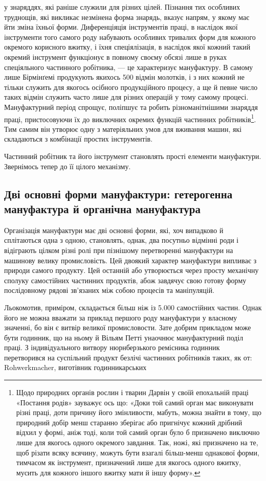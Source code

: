 \parcont{}  %
у знаряддях, які раніше служили для різних цілей. Пізнання
тих особливих труднощів, які викликає незмінена форма знарядь,
вказує напрям, у якому має йти зміна їхньої форми. Диференціяція
інструментів праці, в наслідок якої інструменти того самого роду
набувають особливих тривалих форм для кожного окремого
корисного вжитку, і їхня спеціялізація, в наслідок якої кожний
такий окремий інструмент функціонує в повному своєму обсязі
лише в руках спеціяльного частинного робітника, — це характеризує мануфактуру.
В самому лише Бірмінґемі продукують
якихось 500 відмін молотків, і з них кожний не тільки служить
для якогось осібного продукційного процесу, а ще й певне число
таких відмін служить часто лише для різних операцій у тому
самому процесі. Мануфактурний період спрощує, поліпшує та
робить різноманітнішими знаряддя праці, пристосовуючи їх до
виключних окремих функцій частинних робітників\footnote{
Щодо природних органів рослин і тварин Дарвін у своїй епохальній праці
«Постання родів» зауважує ось що: «Доки той самий орган має виконувати різні
праці, доти причину його змінливости, мабуть, можна знайти в тому, що природний
добір менш старанно зберігає або пригнічує кожний дрібний відхил у
формі, аніж тоді, коли той самий орган було б призначено виключно лише для
якогось одного окремого завдання. Так, ножі, які призначено на те, щоб різати
всяку всячину, можуть бути взагалі більш-менш однакової форми, тимчасом як
інструмент, призначений лише для якогось одного вжитку, мусить для кожного
іншого вжитку мати й іншу форму».
}. Тим самим він утворює одну з матеріяльних умов для вживання машин,
які складаються з комбінації простих інструментів.

Частинний робітник та його інструмент становлять прості
елементи мануфактури. Звернімось тепер до її цілого механізму.

\subsection{Дві основні форми мануфактури: гетерогенна мануфактура
й органічна мануфактура}

Організація мануфактури має дві основні форми, які, хоч
випадково й сплітаються одна з одною, становлять, однак, два
посутньо відмінні роди і відіграють цілком різні ролі при пізнішому перетворенні
мануфактури на машинову велику промисловість. Цей двоякий характер мануфактури
випливає з природи самого продукту. Цей останній або утворюється через просту
механічну сполуку самостійних частинних продуктів, абож
завдячує свою готову форму послідовному рядові зв’язаних між
собою процесів та маніпуляцій.

Льокомотив, приміром, складається більш ніж із \num{5.000} самостійних частин. Однак
його не можна вважати за приклад першого роду мануфактури у власному значенні,
бо він є витвір великої промисловости. Зате добрим прикладом може бути годинник,
що на ньому й Вільям Петті унаочнює мануфактурний поділ праці. З індивідуального
витвору нюрнберзького ремісника годинник перетворився на суспільний продукт
безлічі частинних робітників
таких, як от: Rohwerkmacher, виготівник годинникарських
\parbreak{}  %
